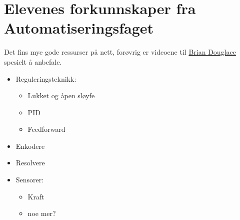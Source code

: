 \section{Elevenes forkunnskaper fra Automatiseringsfaget} \label{Sec: KoordDataEl}

    Det fins mye gode ressurser på nett, forøvrig er videoene til \href{https://www.youtube.com/user/ControlLectures}{Brian Douglace} spesielt å anbefale.

    \begin{itemize}
        \item Reguleringsteknikk:
            \begin{itemize}
                \item Lukket og åpen sløyfe
                \item PID
                \item Feedforward
            \end{itemize}
        \item Enkodere
        \item Resolvere
        \item Sensorer:
            \begin{itemize}
                \item Kraft
                \item noe mer?
            \end{itemize}
    \end{itemize}
